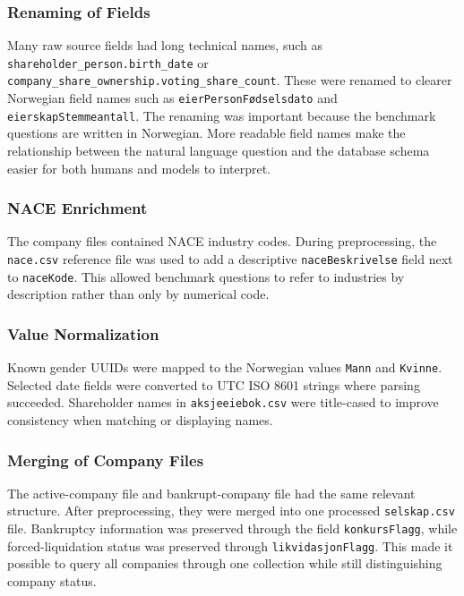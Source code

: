 \subsubsection{Renaming of Fields}

Many raw source fields had long technical names, such as \texttt{shareholder\_person.birth\_date} or \texttt{company\_share\_ownership.voting\_share\_count}. These were renamed to clearer Norwegian field names such as \texttt{eierPersonFødselsdato} and \texttt{eierskapStemmeantall}. The renaming was important because the benchmark questions are written in Norwegian. More readable field names make the relationship between the natural language question and the database schema easier for both humans and models to interpret.

\subsubsection{NACE Enrichment}

The company files contained NACE industry codes. During preprocessing, the \texttt{nace.csv} reference file was used to add a descriptive \texttt{naceBeskrivelse} field next to \texttt{naceKode}. This allowed benchmark questions to refer to industries by description rather than only by numerical code.

\subsubsection{Value Normalization}

Known gender UUIDs were mapped to the Norwegian values \texttt{Mann} and \texttt{Kvinne}. Selected date fields were converted to UTC ISO 8601 strings where parsing succeeded. Shareholder names in \texttt{aksjeeiebok.csv} were title-cased to improve consistency when matching or displaying names.

\subsubsection{Merging of Company Files}

The active-company file and bankrupt-company file had the same relevant structure. After preprocessing, they were merged into one processed \texttt{selskap.csv} file. Bankruptcy information was preserved through the field \texttt{konkursFlagg}, while forced-liquidation status was preserved through \texttt{likvidasjonFlagg}. This made it possible to query all companies through one collection while still distinguishing company status.

